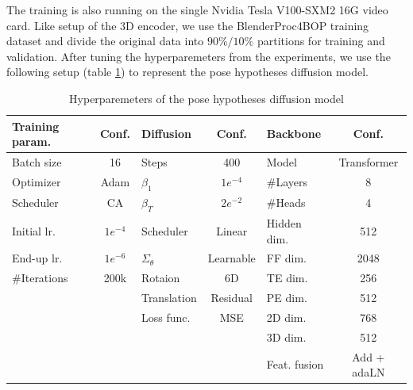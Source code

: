 \documentclass[12pt,DIV14,BCOR12mm,a4paper,footinclude=false,headinclude,parskip=half-,twoside,openright,cleardoublepage=empty,toc=index,bibliography=totoc,listof=totoc]{scrreprt}
\numberwithin{equation}{chapter}
\begin{document}
The training is also running on the single Nvidia Tesla V100-SXM2 16G video card. Like setup of the 3D encoder, we use the BlenderProc4BOP training dataset and divide the original data into $90\%/10\%$ partitions for training and validation. After tuning the hyperparemeters from the experiments, we use the following setup (table \ref{tab:hyper}) to represent the pose hypotheses diffusion model.
\begin{table}[h]
  \centering
  \caption{Hyperparemeters of the pose hypotheses diffusion model}
  \label{tab:hyper}
  \begin{tabular}{l c | l c | l c}
      \toprule
      Training param. & Conf. & Diffusion & Conf. & Backbone & Conf.\\
      \midrule
      Batch size & 16 & Steps & 400 & Model & Transformer\\
      Optimizer & Adam & $\beta_{1}$ & $1e^{-4}$ & \#Layers & 8\\
      Scheduler & CA & $\beta_{T}$ & $2e^{-2}$ & \#Heads & 4\\
      Initial lr. & $1e^{-4}$ & Scheduler & Linear & Hidden dim. & 512\\
      End-up lr. & $1e^{-6}$ & $\Sigma_{\theta}$ & Learnable & FF dim. & 2048\\
      \#Iterations & 200k & Rotaion & 6D & TE dim. & 256\\
       &  & Translation & Residual & PE dim. & 512\\
       &  & Loss func. & MSE & 2D dim. & 768\\
       &  & & & 3D dim. & 512\\
       &  & & & Feat. fusion & Add + adaLN\\
      \bottomrule
  \end{tabular}
\end{table}
\end{document}
